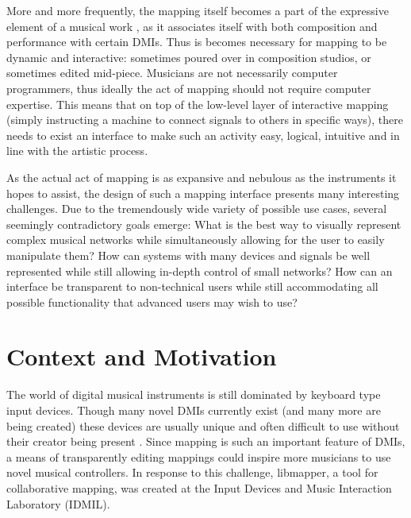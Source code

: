 More and more frequently, the mapping itself becomes a part of the expressive element of a musical work ,
as it associates itself with both composition and performance with certain DMIs. Thus is becomes necessary for mapping to be dynamic and interactive: sometimes poured over in composition studios, or sometimes edited mid-piece. Musicians are not necessarily computer programmers, thus ideally the act of mapping should not require computer expertise. This means that on top of the low-level layer of interactive mapping (simply instructing a machine to connect signals to others in specific ways), there needs to exist an interface to make such an activity easy, logical, intuitive and in line with the artistic process.

As the actual act of mapping is as expansive and nebulous as the instruments it hopes to assist, the design of such a mapping interface presents many interesting challenges. Due to the tremendously wide variety of possible use cases, several seemingly contradictory goals emerge: What is the best way to visually represent complex musical networks while simultaneously allowing for the user to easily manipulate them? How can systems with many devices and signals be well represented while still allowing in-depth control of small networks? How can an interface be transparent to non-technical users while still accommodating all possible functionality that advanced users may wish to use? 


\section{Context and Motivation}

The world of digital musical instruments is still dominated by keyboard type input devices. Though many novel DMIs currently exist (and many more are being created) these devices are usually unique and often difficult to use without their creator being present \cite{squeezevox}.
Since mapping is such an important feature of DMIs, a means of transparently editing mappings could inspire more musicians to use novel musical controllers. In response to this challenge, libmapper, a tool for collaborative mapping, was created at the Input Devices and Music Interaction Laboratory (IDMIL).

